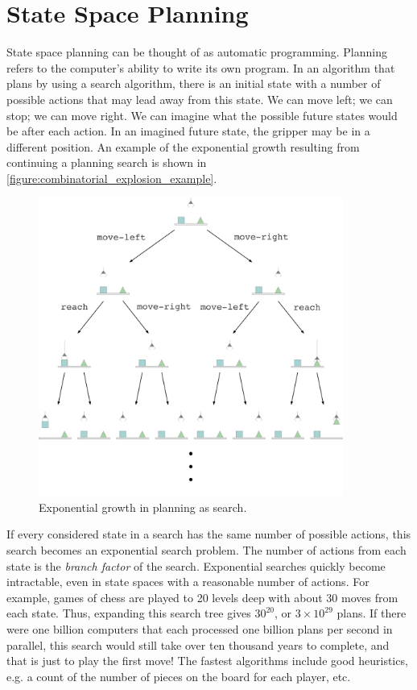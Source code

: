\section{State Space Planning}

State space planning can be thought of as automatic programming.
Planning refers to the computer's ability to write its own program.
In an algorithm that plans by using a search algorithm, there is an
initial state with a number of possible actions that may lead away
from this state.  We can move left; we can stop; we can move right.
We can imagine what the possible future states would be after each
action.  In an imagined future state, the gripper may be in a
different position.  An example of the exponential growth resulting
from continuing a planning search is shown in
{\mbox{\autoref{figure:combinatorial_explosion_example}}}.
\begin{figure}
\center
\includegraphics[width=10cm]{gfx/combinatorial_explosion_example}
\caption{Exponential growth in planning as search.}
\label{figure:combinatorial_explosion_example}
\end{figure}
If every considered state in a search has the same number of possible
actions, this search becomes an exponential search problem.  The
number of actions from each state is the \emph{branch factor} of the
search.  Exponential searches quickly become intractable, even in
state spaces with a reasonable number of actions.  For example, games
of chess are played to 20 levels deep with about 30 moves from each
state.  Thus, expanding this search tree gives $30^{20}$, or $3 \times
10^{29}$ plans.  If there were one billion computers that each
processed one billion plans per second in parallel, this search would
still take over ten thousand years to complete, and that is just to
play the first move!  The fastest algorithms include good heuristics,
e.g. a count of the number of pieces on the board for each player,
etc.

